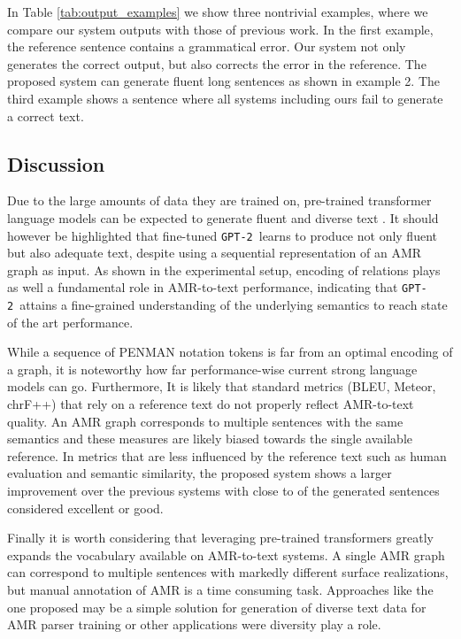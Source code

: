 \documentclass[11pt,a4paper]{article}
\newcommand{\GPT}{\texttt{GPT-2}}
\begin{document}
In Table \ref{tab:output_examples} we show three nontrivial examples, where we compare our system outputs with those of previous work. In the first example, the reference sentence contains a grammatical error. Our system not only generates the correct output, but also corrects the error in the reference. The proposed system can generate fluent long sentences as shown in example 2. The third example shows a sentence where all systems including ours fail to generate a correct text. 

\subsection{Discussion}
\label{subsec:discussion}

Due to the large amounts of data they are trained on, pre-trained transformer language models can be expected to generate fluent and diverse text \cite{see2019massively}. It should however be highlighted that fine-tuned \GPT~learns to produce not only fluent but also adequate text, despite using a sequential representation of an AMR graph as input. As shown in the experimental setup, encoding of relations plays as well a fundamental role in AMR-to-text performance, indicating that \GPT~attains a fine-grained understanding of the underlying semantics to reach state of the art performance.

While a sequence of PENMAN notation tokens is far from an optimal encoding of a graph, it is noteworthy how far performance-wise current strong language models can go. Furthermore, It is likely that standard metrics (BLEU, Meteor, chrF++) that rely on a reference text do not properly reflect AMR-to-text quality. An AMR graph corresponds to multiple sentences with the same semantics and these measures are likely biased towards the single available reference. In metrics that are less influenced by the reference text such as human evaluation and semantic similarity, the proposed system shows a larger improvement over the previous systems with close to  of the generated sentences considered excellent or good. 

Finally it is worth considering that leveraging pre-trained transformers greatly expands the vocabulary available on AMR-to-text systems. A single AMR graph can correspond to multiple sentences with markedly different surface realizations, but manual annotation of AMR is a time consuming task. Approaches like the one proposed may be a simple solution for generation of diverse text data for AMR parser training or other applications were diversity play a role.
\end{document}
